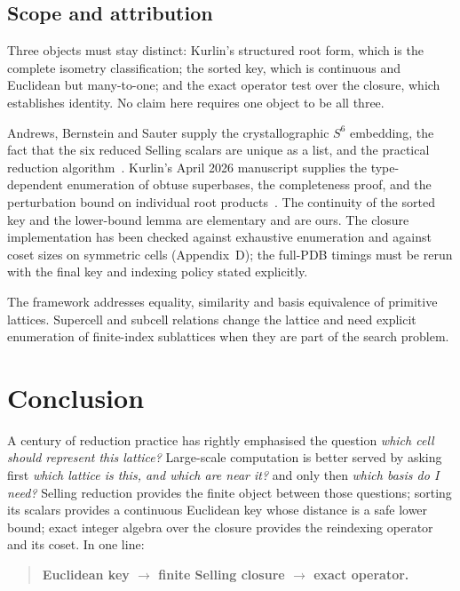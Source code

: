 \documentclass[11pt]{article}
\begin{document}
\subsection{Scope and attribution}

Three objects must stay distinct: Kurlin's structured root form, which is the complete isometry classification; the sorted key, which is continuous and Euclidean but many-to-one; and the exact operator test over the closure, which establishes identity. No claim here requires one object to be all three.

Andrews, Bernstein and Sauter supply the crystallographic $S^6$ embedding, the fact that the six reduced Selling scalars are unique as a list, and the practical reduction algorithm~\cite{ab1988,abs2019,ab2023}. Kurlin's April 2026 manuscript supplies the type-dependent enumeration of obtuse superbases, the completeness proof, and the perturbation bound on individual root products~\cite{kurlin2026}. The continuity of the sorted key and the lower-bound lemma are elementary and are ours. The closure implementation has been checked against exhaustive enumeration and against coset sizes on symmetric cells (Appendix~D); the full-PDB timings must be rerun with the final key and indexing policy stated explicitly.

The framework addresses equality, similarity and basis equivalence of primitive lattices. Supercell and subcell relations change the lattice and need explicit enumeration of finite-index sublattices when they are part of the search problem.

\section{Conclusion}

A century of reduction practice has rightly emphasised the question \emph{which cell should represent this lattice?} Large-scale computation is better served by asking first \emph{which lattice is this, and which are near it?} and only then \emph{which basis do I need?} Selling reduction provides the finite object between those questions; sorting its scalars provides a continuous Euclidean key whose distance is a safe lower bound; exact integer algebra over the closure provides the reindexing operator and its coset. In one line:
\begin{quote}
\textbf{Euclidean key $\rightarrow$ finite Selling closure $\rightarrow$ exact operator.}
\end{quote}
\end{document}
